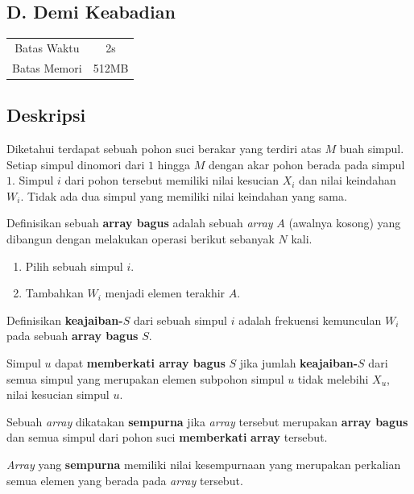 \documentclass{article}
\begin{document}
\begin{center}
    \section*{D. Demi Keabadian} %

    \begin{tabular}{ | c c | }
        \hline
        Batas Waktu  & 2s \\    %
        Batas Memori & 512MB \\  %
        \hline
    \end{tabular}
\end{center}

\subsection*{Deskripsi}
Diketahui terdapat sebuah pohon suci berakar yang terdiri atas $M$ buah simpul. Setiap simpul dinomori dari $1$ hingga $M$ dengan akar pohon berada pada simpul $1$. Simpul $i$ dari pohon tersebut memiliki nilai kesucian $X_i$ dan nilai keindahan $W_i$. Tidak ada dua simpul yang memiliki nilai keindahan yang sama.

Definisikan sebuah \textbf{array bagus} adalah sebuah \textit{array} $A$ (awalnya kosong) yang dibangun dengan melakukan operasi berikut sebanyak $N$ kali.

\begin{enumerate}
    \item Pilih sebuah simpul $i$.
    \item Tambahkan $W_i$ menjadi elemen terakhir $A$.
\end{enumerate}

Definisikan \textbf{keajaiban-$S$} dari sebuah simpul $i$ adalah frekuensi kemunculan $W_i$ pada sebuah \textbf{array bagus} $S$.

Simpul $u$ dapat \textbf{memberkati array bagus} $S$ jika jumlah \textbf{keajaiban-$S$} dari semua simpul yang merupakan elemen subpohon simpul $u$ tidak melebihi $X_u$,  nilai kesucian simpul $u$.

Sebuah \textit{array} dikatakan \textbf{sempurna} jika \textit{array} tersebut merupakan \textbf{array bagus} dan semua simpul dari pohon suci \textbf{memberkati} \textbf{array} tersebut.

\textit{Array} yang \textbf{sempurna} memiliki nilai kesempurnaan yang merupakan perkalian semua elemen yang berada pada \textit{array} tersebut.
\end{document}
